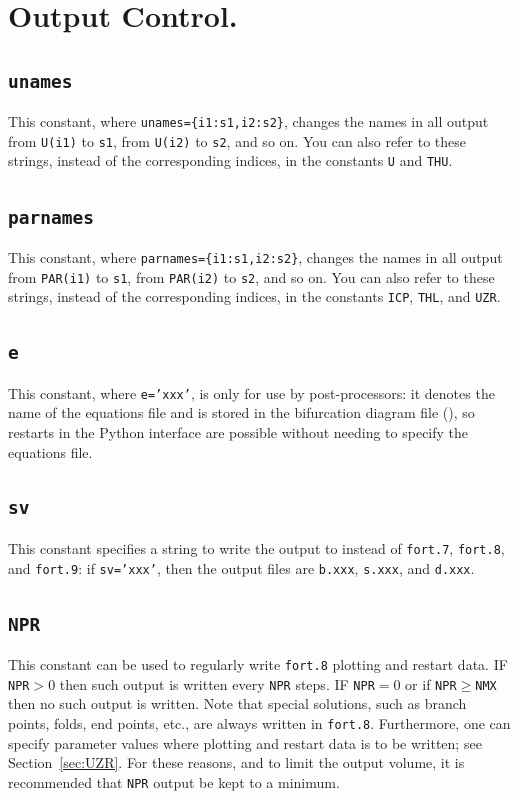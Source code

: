 \documentclass[12pt]{report}
\begin{document}
\section{ Output Control.} \label{sec:Output_control}
\subsection{\texttt{unames}}  \label{sec:unames}
This constant, where {\tt unames=\{i1:s1,i2:s2\}}, changes the names in all
output from {\tt U(i1)} to {\tt s1}, from {\tt U(i2)} to {\tt s2}, and so on.
You can also refer to these strings, instead of the corresponding indices,
in the constants \texttt{U} and \texttt{THU}.

\subsection{\texttt{parnames}}  \label{sec:parnames}
This constant, where {\tt parnames=\{i1:s1,i2:s2\}}, changes the names in all
output from {\tt PAR(i1)} to {\tt s1}, from {\tt PAR(i2)} to {\tt s2},
and so on.
You can also refer to these strings, instead of the corresponding indices,
in the constants \texttt{ICP}, \texttt{THL}, and \texttt{UZR}.

\subsection{\texttt{e}}  \label{sec:e}
This constant, where {\tt e='xxx'}, is only for use by post-processors:
it denotes the name of the equations file and is stored
in the bifurcation diagram file (), so restarts in the
Python interface are possible without needing to specify the equations
file.

\subsection{\texttt{sv}} \label{sec:sv}
This constant specifies a string to write the output to instead of
{\tt fort.7}, {\tt fort.8}, and {\tt fort.9}: if {\tt sv='xxx'}, then
the output files are
{\tt b.xxx}, {\tt s.xxx}, and {\tt d.xxx}.

\subsection{\texttt{NPR}}  \label{sec:NPR}
 This constant can be used to regularly write {\tt fort.8} plotting and restart 
 data.  
 IF {\tt NPR}$>$0 then such output is written every {\tt NPR} steps.
 IF {\tt NPR}$=$0 or if {\tt NPR}$\ge${\tt NMX} then no such output is written.
 Note that special solutions, such as branch points, folds, end points, etc., 
 are always written in {\tt fort.8}.
 Furthermore, one can specify parameter values where plotting and restart 
 data is to be written; see Section~\ref{sec:UZR}.
 For these reasons, and to limit the output volume, it is recommended that
 {\tt NPR} output be kept to a minimum.
\end{document}
